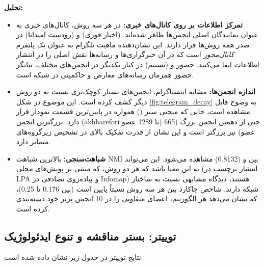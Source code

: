 \documentclass{article}
\begin{document}
	\textbf{تحلیل:}
	\begin{itemize}
		\item \textbf{تمرکز اطلاعات بر روی کانال‌های خبری:} در هر سه روش، کانال‌های خبری به عنوان نمایندگان اصلی انجمن‌ها ظاهر شده‌اند.  (اخبار فوری) و  (رودست امیدانا) در صدر همه روش‌ها قرار دارند. این نشان‌دهنده ماهیت تلگرام به عنوان یک پلتفرم \textit{کانال‌محور} است که در آن خبرگزاری‌ها و رسانه‌ها نقش اصلی را در انتشار اطلاعات ایفا می‌کنند. حضور  و  (تسنیم) در کنار یکدیگر در انجمن‌های مختلف، بیانگر حضور همزمان رسانه‌های معارض و حاکمیتی در شبکه است.
		\item \textbf{اندازه انجمن‌ها:} مشابه اینستاگرام،  انجمن‌های بسیار کوچک‌تری نسبت به دو روش دیگر کشف کرده است. این موضوع در شکل \ref{fig:telegram_decay} به وضوح قابل مشاهده است، جایی که منحنی سبز () همواره در پایین‌ترین قسمت نمودار قرار دارد. بزرگترین انجمن  (akhbarefori با 1289 عضو) حتی از دهمین انجمن بزرگ  (665 عضو) نیز بزرگتر است و این نشان از قدرت تفکیک بالای  در تشخیص زیرگروه‌های متمایز دارد.
		\item \textbf{شباهت‌سنجی:} بالاترین شباهت NMI بین  و  (0.8132) مشاهده می‌شود. این می‌تواند به این معنا باشد که هر دو روش، که مبتنی بر پویش‌های محلی (انتشار برچسب در LPA و پیاده‌روی تصادفی در Infomap) هستند، دیدگاه مشابهی نسبت به ساختار شبکه دارند. شاخص جاکارد بین هر سه روش نسبتاً پایین است (بین 0.176 تا 0.25)، که نشان می‌دهد هر الگوریتم، اعضای متفاوتی را در 10 انجمن برتر خود دسته‌بندی کرده است.
	\end{itemize}
	
	\subsection*{توییتر: بستر مناقشه و تنوع ایدئولوژیک}
	نتایج توییتر در جدول زیر نشان داده شده است:
	
\end{document}
